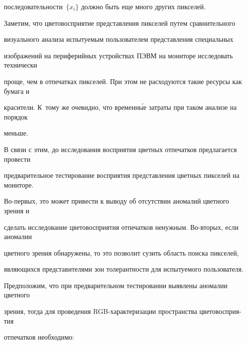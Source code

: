 последовательности~$\{x_i\}$ должно быть еще много других пикселей.





Заметим, что цветовосприятие представления пикселей путем сравнительного


визуального анализа испытуемым пользователем представления специальных


изображений на периферийных устройствах ПЭВМ на мониторе исследовать технически


проще, чем в отпечатках пикселей. При этом не расходуются такие ресурсы как бумага и


красители. К~тому же очевидно, что временн\'{ы}е затраты при таком анализе на порядок


меньше.





В связи с этим, до исследования восприятия цветных отпечатков предлагается провести


предварительное тестирование восприятия представления цветных пикселей на мониторе.


Во-пер\-вых, это может привести к выводу об отсутствии аномалий цветного зрения и


сделать исследование цветовосприятия отпечатков ненужным. Во-вторых, если аномалии


цветного зрения обнаружены, то это позволит сузить область поиска пикселей,


являющихся представителями зон толерантности для ис\-пы\-ту\-емо\-го пользователя.


Предположим, что при предварительном тестировании выявлены аномалии цветного


зрения, тогда для проведения RGB-характеризации пространства цветовосприя-\linebreak тия


отпечатков необходимо:


